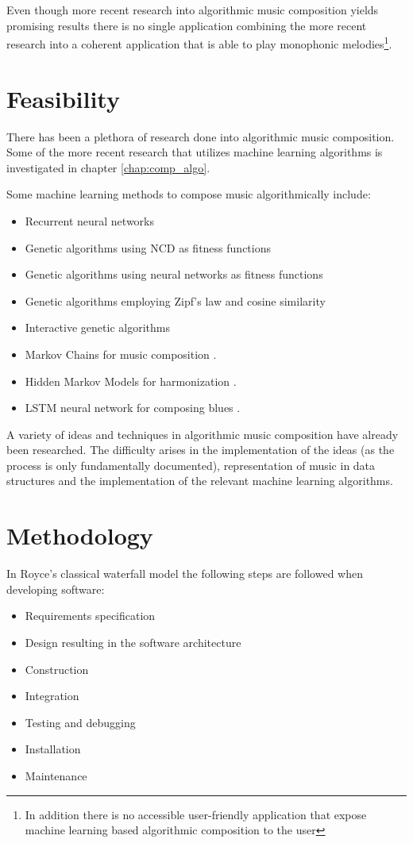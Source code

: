 Even though more recent research into algorithmic music composition yields promising results there is no single application combining the more recent research into a coherent application that is able to play monophonic melodies\footnote{In addition there is no accessible user-friendly application that expose machine learning based algorithmic composition to the user}.


\section{Feasibility}
There has been a plethora of research done into algorithmic music composition. Some of the more recent research that utilizes machine learning algorithms is investigated in chapter \ref{chap:comp_algo}.

Some machine learning methods to compose music algorithmically include:
\begin{itemize}
\item Recurrent neural networks \cite{Eck2002, mozer1994neural,Chen2001}
\item Genetic algorithms using \acs{NCD} as fitness functions \cite{Alfonseca2006,Dostal2013}
\item Genetic algorithms using neural networks as fitness functions \cite{gibson1991neurogen,Biles1996,Burton97geneticalgorithm}
\item Genetic algorithms employing Zipf's law and cosine similarity \cite{Dostal2013,Manaris2007,Manaris2005}
\item Interactive genetic algorithms \cite{Biles1994, Biles1996,Unehara,Spector_inductionand,Johanson1998}
\item Markov Chains for music composition \cite{McAlpine1999, Farbood2001}.
\item Hidden Markov Models for harmonization \cite{Allan2004}.
\item LSTM neural network for composing blues \cite{Eck2002}.
\end{itemize}

A variety of ideas and techniques in algorithmic music composition have already been researched. The difficulty arises in the implementation of the ideas (as the process is only fundamentally documented), representation of music in data structures and the implementation of the relevant machine learning algorithms.

\section{Methodology}
In Royce's classical waterfall model the following steps are followed when developing software:
\begin{itemize}
\item Requirements specification
\item Design resulting in the software architecture
\item Construction
\item Integration
\item Testing and debugging
\item Installation
\item Maintenance
\end{itemize}

